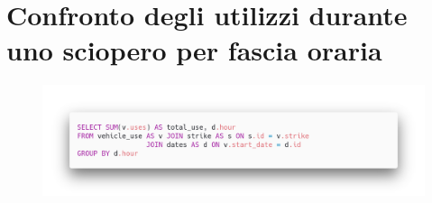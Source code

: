 \section{Confronto degli utilizzi durante uno sciopero per fascia oraria}
\begin{figure}[H]                                                                                                                                                            
\centering                                                                                                                                                                   
\includegraphics[width=\textwidth]{images/query3}                                                                                                                                   
\label{fig:query3}                                                                                                                                                           
\end{figure}


